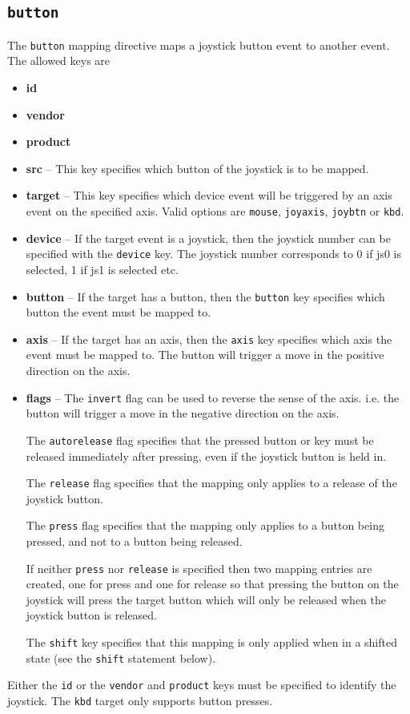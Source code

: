 \documentclass{article}
\begin{document}
\subsection{{\tt button}}
The {\tt button} mapping directive maps a joystick button event 
to another event. The allowed keys are 
\begin{itemize}
	\item {\bf id}
	\item {\bf vendor}
	\item {\bf product}
	\item {\bf src} -- This key specifies which button of the joystick is to be mapped.
	\item {\bf target} -- This key specifies which device event will be triggered
				by an axis event on the specified axis. Valid
				options are {\tt mouse}, {\tt joyaxis}, {\tt joybtn} or {\tt kbd}.
	\item {\bf device} -- If the target event is a joystick, then the joystick 
				number can be specified with the {\tt device} key.
				The joystick number corresponds to 0 if js0 is selected, 1 if js1 is selected etc.
	\item {\bf button} -- If the target has a button, then the {\tt button} key specifies
				which button the event must be mapped to.
	\item {\bf axis} -- If the target has an axis, then the {\tt axis} key specifies
				which axis the event must be mapped to. The button
				will trigger a move in the positive direction on the axis.
	\item {\bf flags} -- The {\tt invert} flag can be used to reverse the sense of the
				axis. i.e. the button will trigger a move in the negative 
				direction on the axis.

				The {\tt autorelease} flag specifies that the pressed button or key
				must be released immediately after pressing, even if the joystick
				button is held in.

				The {\tt release} flag specifies that the mapping only applies
				to a release of the joystick button.

				The {\tt press} flag specifies that the mapping only applies
				to a button being pressed, and not to a button being released.

				If neither {\tt press} nor {\tt release} is specified then
				two mapping entries are created, one for press and one for
				release so that pressing the button on the joystick will
				press the target button which will only be released when
				the joystick button is released.
			
				The {\tt shift} key specifies that this mapping is only
				applied when in a shifted state (see the {\tt shift} statement below).
\end{itemize}
Either the {\tt id} or the {\tt vendor} and {\tt product} keys must be specified to identify the
joystick. The {\tt kbd} target only supports button presses.
\end{document}
